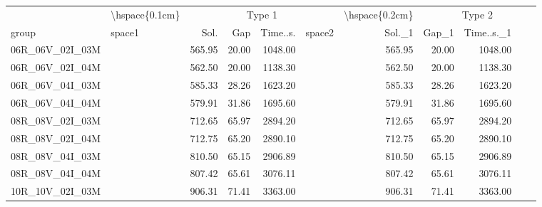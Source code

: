 
\begin{tabular}{llrrrlrrr}
\toprule
\multicolumn{1}{c}{} & \multicolumn{1}{c}{\textbackslash{}hspace\{0.1cm\}} & \multicolumn{4}{c}{Type 1} & \multicolumn{1}{c}{\textbackslash{}hspace\{0.2cm\}} & \multicolumn{4}{c}{Type 2} \\
\cmidrule(l{3pt}r{3pt}){2-2} \cmidrule(l{3pt}r{3pt}){3-6} \cmidrule(l{3pt}r{3pt}){7-7} \cmidrule(l{3pt}r{3pt}){8-11}
group & space1 & Sol. & Gap & Time..s. & space2 & Sol.\_1 & Gap\_1 & Time..s.\_1\\
\midrule
06R\_06V\_02I\_03M & \hspace{0.1cm} & 565.95 & 20.00 & 1048.00 & \hspace{0.2cm} & 565.95 & 20.00 & 1048.00\\
06R\_06V\_02I\_04M & \hspace{0.1cm} & 562.50 & 20.00 & 1138.30 & \hspace{0.2cm} & 562.50 & 20.00 & 1138.30\\
06R\_06V\_04I\_03M & \hspace{0.1cm} & 585.33 & 28.26 & 1623.20 & \hspace{0.2cm} & 585.33 & 28.26 & 1623.20\\
06R\_06V\_04I\_04M & \hspace{0.1cm} & 579.91 & 31.86 & 1695.60 & \hspace{0.2cm} & 579.91 & 31.86 & 1695.60\\
\addlinespace
08R\_08V\_02I\_03M & \hspace{0.1cm} & 712.65 & 65.97 & 2894.20 & \hspace{0.2cm} & 712.65 & 65.97 & 2894.20\\
08R\_08V\_02I\_04M & \hspace{0.1cm} & 712.75 & 65.20 & 2890.10 & \hspace{0.2cm} & 712.75 & 65.20 & 2890.10\\
08R\_08V\_04I\_03M & \hspace{0.1cm} & 810.50 & 65.15 & 2906.89 & \hspace{0.2cm} & 810.50 & 65.15 & 2906.89\\
08R\_08V\_04I\_04M & \hspace{0.1cm} & 807.42 & 65.61 & 3076.11 & \hspace{0.2cm} & 807.42 & 65.61 & 3076.11\\
\addlinespace
10R\_10V\_02I\_03M & \hspace{0.1cm} & 906.31 & 71.41 & 3363.00 & \hspace{0.2cm} & 906.31 & 71.41 & 3363.00\\

\end{tabular}
